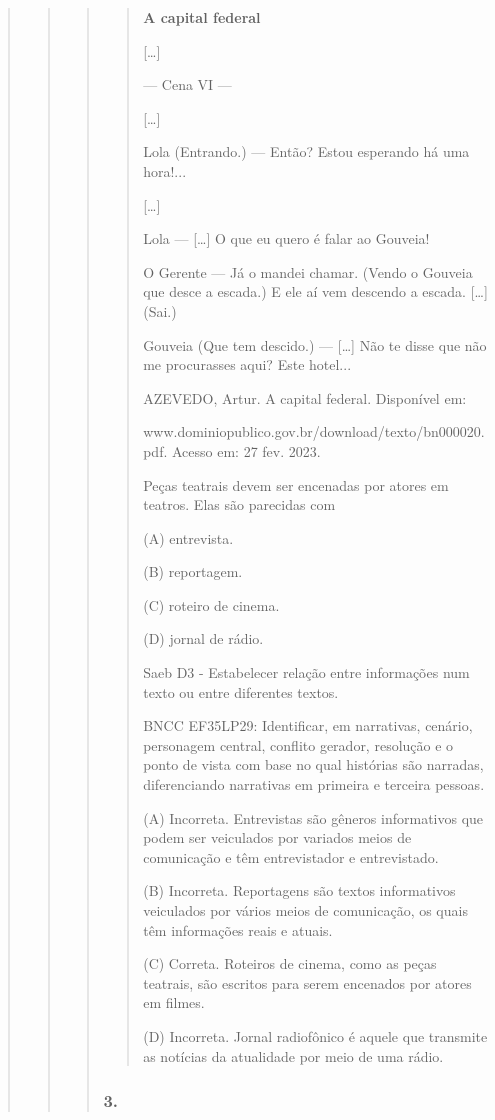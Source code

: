 \begin{quote}
\begin{quote}
\begin{quote}
\begin{quote}
\textbf{A capital federal}

{[}\ldots{}{]}

--- Cena VI ---

{[}\ldots{}{]}

Lola (Entrando.) --- Então? Estou esperando há uma hora!...

{[}\ldots{}{]}

Lola --- {[}\ldots{}{]} O que eu quero é falar ao Gouveia!

O Gerente --- Já o mandei chamar. (Vendo o Gouveia que desce a escada.)
E ele aí vem descendo a escada. {[}\ldots{}{]} (Sai.)

Gouveia (Que tem descido.) --- {[}\ldots{}{]} Não te disse que não me
procurasses aqui? Este hotel...

AZEVEDO, Artur. A capital federal. Disponível em:

www.dominiopublico.gov.br/download/texto/bn000020.pdf. Acesso em: 27
fev. 2023.

Peças teatrais devem ser encenadas por atores em teatros. Elas são
parecidas com

(A) entrevista.

(B) reportagem.

(C) roteiro de cinema.

(D) jornal de rádio.

Saeb D3 - Estabelecer relação entre informações num texto ou entre
diferentes textos.

BNCC EF35LP29: Identificar, em narrativas, cenário, personagem central,
conflito gerador, resolução e o ponto de vista com base no qual
histórias são narradas, diferenciando narrativas em primeira e terceira
pessoas.

(A) Incorreta. Entrevistas são gêneros informativos que podem ser
veiculados por variados meios de comunicação e têm entrevistador e
entrevistado.

(B) Incorreta. Reportagens são textos informativos veiculados por vários
meios de comunicação, os quais têm informações reais e atuais.

(C) Correta. Roteiros de cinema, como as peças teatrais, são escritos
para serem encenados por atores em filmes.

(D) Incorreta. Jornal radiofônico é aquele que transmite as notícias da
atualidade por meio de uma rádio.
\end{quote}

\subsubsection{3. }\label{section-86}


\end{quote}
\end{quote}
\end{quote}
